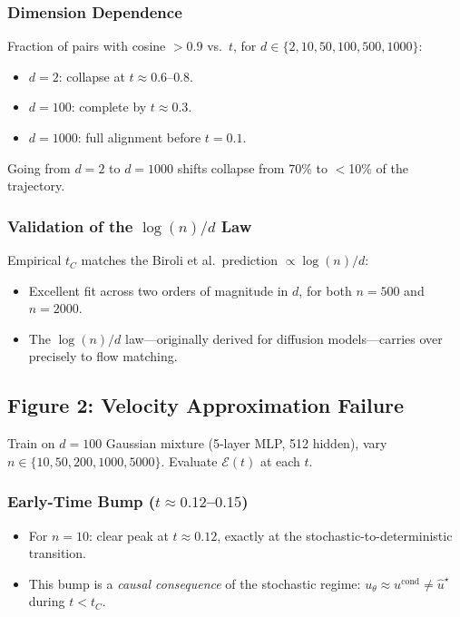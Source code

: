 \documentclass[11pt, a4paper]{article}
\theoremstyle{plain}
\theoremstyle{definition}
\theoremstyle{remark}
\begin{document}
\subsubsection{Dimension Dependence}

Fraction of pairs with cosine $> 0.9$ vs.\ $t$, for $d \in \{2, 10, 50, 100, 500, 1000\}$:
\begin{itemize}
  \item $d=2$: collapse at $t \approx 0.6$--$0.8$.
  \item $d=100$: complete by $t \approx 0.3$.
  \item $d=1000$: full alignment before $t=0.1$.
\end{itemize}
Going from $d=2$ to $d=1000$ shifts collapse from 70\% to $<$10\% of the trajectory.

\subsubsection{Validation of the $\log(n)/d$ Law}

Empirical $t_C$ matches the Biroli et al.\ prediction $\propto \log(n)/d$:
\begin{itemize}
  \item Excellent fit across two orders of magnitude in $d$, for both $n=500$ and $n=2000$.
  \item The $\log(n)/d$ law---originally derived for diffusion models---carries over precisely to flow matching.
\end{itemize}

\subsection{Figure 2: Velocity Approximation Failure}

Train on $d=100$ Gaussian mixture (5-layer MLP, 512 hidden), vary $n \in \{10, 50, 200, 1000, 5000\}$.
Evaluate $\mathcal{E}(t)$ at each $t$.

\subsubsection{Early-Time Bump ($t \approx 0.12$--$0.15$)}
\begin{itemize}
  \item For $n=10$: clear peak at $t \approx 0.12$, exactly at the stochastic-to-deterministic transition.
  \item This bump is a \emph{causal consequence} of the stochastic regime: $u_\theta \approx u^{\mathrm{cond}} \neq \hat{u}^\star$ during $t < t_C$.
\end{itemize}
\end{document}
